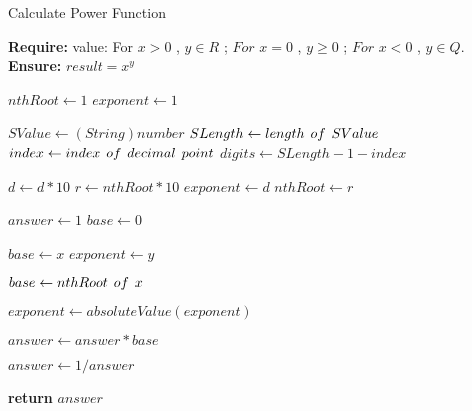 \documentclass{article}
\begin{document}
\begin{algorithm}

\caption{Calculate Power Function}

\textbf{Require:}  value: For  $ x > 0$ ,  $y \in R$ ;	
   $For$ $ x = 0$ , $ y \ge 0$ ;
   $For$ $ x < 0$ , $ y \in Q $.
\textbf{Ensure:} $result =  x^y$

\begin{algorithmic}[1]
 \State $nthRoot \leftarrow 1$
  \State $exponent \leftarrow 1 $ 
  \Statex
  
   \State $SValue \leftarrow (String)number $
   \State $SLength \leftarrow length\hspace{0.15cm}  of\hspace{0.15cm}  SValue $
   \State $index \leftarrow index\hspace{0.15cm} of\hspace{0.15cm}  decimal\hspace{0.15cm}  point $
   \State $digits \leftarrow SLength -1 -index  $
   
   \State $d \leftarrow d * 10$
   \State $r \leftarrow nthRoot * 10$
   \EndFor
    \State $exponent \leftarrow d$
    \State $nthRoot \leftarrow r$
\Statex  


\noindent{}
    
    \State $answer \leftarrow 1 $
    \State $base \leftarrow 0 $
    
    \State $base \leftarrow x $
     \State $exponent \leftarrow y $
   
   \Else
   
    \State{}
    \State $base \leftarrow nthRoot \hspace{0.15cm} of \hspace{0.15cm} x$
    
    \EndIf
    
     \State $exponent \leftarrow absoluteValue(exponent) $
     \EndIf
     
       \State $answer \leftarrow answer* base$
       \EndFor
      
    \State $answer \leftarrow 1/answer $
    \EndIf
    
    \State \textbf{return} $answer$
    
\end{algorithmic}

\end{algorithm}
\end{document}
